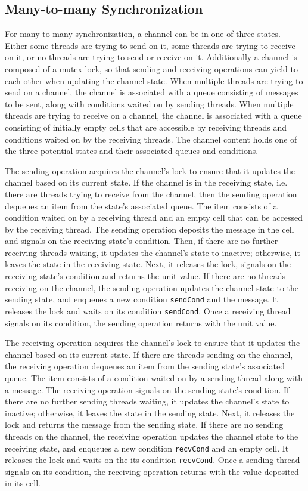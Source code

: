 \documentclass[letterpaper, 11pt]{report}
\begin{document}
\subsection{Many-to-many Synchronization}
For many-to-many synchronization, a channel can be in one of three states.
Either some threads are trying to send on it,
some threads are trying to receive on it, or no threads are trying to send or receive on it.
Additionally a channel is composed of a mutex lock,
so that sending and receiving operations can yield
to each other when updating the channel state. When multiple threads are trying to send on a
channel, the channel is associated with a queue consisting of messages to be sent, along with
conditions waited on by sending threads. When multiple threads are trying to receive on a
channel, the channel is associated with a queue consisting of
initially empty cells that are accessible by receiving threads and
conditions waited on by the receiving threads.
The channel content holds one of the three potential states and their
associated queues and conditions.

The sending operation acquires the channel's lock to
ensure that it updates the channel based on
its current state. If the channel is in the receiving state,
i.e. there are threads trying to receive from the channel,
then the sending operation dequeues an item from the state's associated queue.
The item consists of a condition waited on by a receiving thread and an empty cell
that can be accessed by the receiving thread.
The sending operation deposits the message in the cell and signals on the receiving state's condition.
Then, if there are no further receiving threads waiting, it updates the channel's state to inactive; otherwise,
it leaves the state in the receiving state.
Next, it releases the lock, signals on the receiving state's condition and returns the unit value.
If there are no threads receiving on the
channel, the sending operation updates the channel state to the sending state,
and enqueues a new condition \lstinline{sendCond} and the message.
It releases the lock and waits on its condition \lstinline{sendCond}.
Once a receiving thread signals on its condition, the sending operation returns with the unit value.

The receiving operation acquires the channel's lock
to ensure that it updates the channel based on
its current state. If there are threads
sending on the channel, the receiving 
operation dequeues an item from the sending state's associated queue. The item consists of a condition
waited on by a sending thread along with a message.
The receiving operation signals on the sending state's condition.
If there are no further sending threads waiting, it updates the channel's state to inactive; otherwise,
it leaves the state in the sending state.
Next, it releases the lock and returns the message from the sending state.
If there are no sending threads on the
channel, the receiving operation updates the channel state to the receiving state, and enqueues
a new condition \lstinline{recvCond} and an empty cell. It releases the lock and waits on
the its condition \lstinline{recvCond}. Once a sending thread signals on its condition,
the receiving operation returns with the value deposited in its cell.
\end{document}
